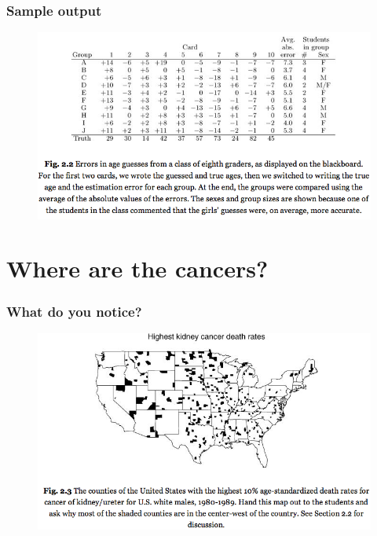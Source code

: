 \documentclass[compress,handout,10pt]{beamer}
\begin{document}
\begin{frame}
    \frametitle{Sample output}
    \vspace{7pt}
    \begin{figure}
        \begin{center}
            \includegraphics[width=\textwidth]{images/guessing-ages-error.png}
        \end{center}
    \end{figure}
\end{frame}

\section{Where are the cancers?}

\begin{frame}
    \frametitle{What do you notice?}
    \vspace{7pt}
    \begin{figure}
        \begin{center}
            \includegraphics[width=\textwidth]{images/HighestKidneyCancerDeathRate.png}
        \end{center}
    \end{figure}
\end{frame}
\end{document}
